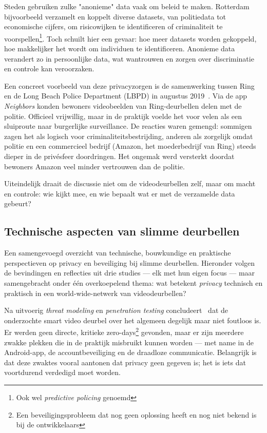 \documentclass[nonacm, sigconf, balance=true]{acmart}
\begin{document}
    Steden gebruiken zulke "anonieme" data vaak om beleid te maken.
    Rotterdam bijvoorbeeld verzamelt en koppelt diverse datasets, van politiedata tot economische cijfers, om risicowijken te identificeren of criminaliteit te voorspellen\footnote{Ook wel \textit{predictive policing} genoemd}.
    Toch schuilt hier een gevaar: hoe meer datasets worden gekoppeld, hoe makkelijker het wordt om individuen te identificeren.
    Anonieme data verandert zo in persoonlijke data, wat wantrouwen en zorgen over discriminatie en controle kan veroorzaken.

    Een concreet voorbeeld van deze privacyzorgen is de samenwerking tussen Ring en de Long Beach Police Department (LBPD) in augustus 2019~\parencite{shaffer2021applying}.
    Via de app \textit{Neighbors} konden bewoners videobeelden van Ring-deurbellen delen met de politie.
    Officieel vrijwillig, maar in de praktijk voelde het voor velen als een sluiproute naar burgerlijke surveillance.
    De reacties waren gemengd: sommigen zagen het als logisch voor criminaliteitsbestrijding, anderen als zorgelijk omdat politie en een commercieel bedrijf (Amazon, het moederbedrijf van Ring) steeds dieper in de privésfeer doordringen.
    Het ongemak werd versterkt doordat bewoners Amazon veel minder vertrouwen dan de politie.

    Uiteindelijk draait de discussie niet om de videodeurbellen zelf, maar om macht en controle: wie kijkt mee, en wie bepaalt wat er met de verzamelde data gebeurt?

    \subsection{Technische aspecten van slimme deurbellen}\label{subsec:technische-aspecten-van-slimme-deurbellen}
    Een samengevoegd overzicht van technische, bouwkundige en praktische perspectieven op privacy en beveiliging bij slimme deurbellen.
    Hieronder volgen de bevindingen en reflecties uit drie studies — elk met hun eigen focus — maar samengebracht onder één overkoepelend thema: wat betekent \emph{privacy} technisch en praktisch in een world-wide-netwerk van videodeurbellen?

    Na uitvoerig \textit{threat modeling} en \textit{penetration testing} concludeert~\parencite{liu2021ethical} dat de onderzochte smart video deurbel over het algemeen degelijk maar niet foutloos is.
    Er werden geen directe, kritieke zero-days\footnote{Een beveiligingsprobleem dat nog geen oplossing heeft en nog niet bekend is bij de ontwikkelaars} gevonden, maar er zijn meerdere zwakke plekken die in de praktijk misbruikt kunnen worden — met name in de Android-app, de accountbeveiliging en de draadloze communicatie.
    Belangrijk is dat deze zwaktes vooral aantonen dat privacy geen gegeven is; het is iets dat voortdurend verdedigd moet worden.
\end{document}
